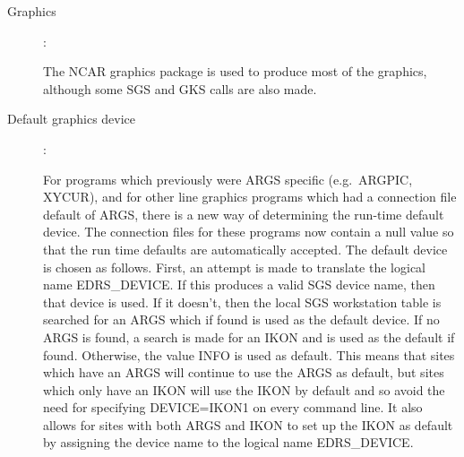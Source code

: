 \begin{description}
\item [Graphics]:

The NCAR graphics package is used to produce most of the graphics, although
some SGS and GKS calls are also made.

\item [Default graphics device]:

For programs which previously were ARGS specific (e.g.\ ARGPIC,  XYCUR), and
for other line graphics programs which had a connection file default of ARGS,
there is a new way of determining the run-time default device.
The connection files for these programs now contain a null value so that the
run time defaults are automatically accepted.
The default device is chosen  as follows.
First, an attempt is made to translate the logical name EDRS\_DEVICE.
If this produces a valid SGS device name, then that device is used.
If it doesn't, then the local SGS workstation table is searched for an ARGS
which if found is used as the default device.
If no ARGS is found, a search is made for an IKON and is used as the default if
found.
Otherwise, the value INFO is used as default.
This means that sites which have an ARGS will continue to use the ARGS as
default, but sites which only have an IKON will use the IKON by default and so
avoid the need for specifying DEVICE=IKON1 on every command line.
It also allows for sites with both ARGS and IKON to set up the IKON as default
by assigning the device name to the logical name EDRS\_DEVICE.

\end{description}

